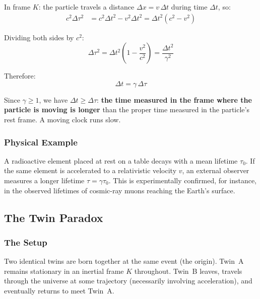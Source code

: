 In frame $K$: the particle travels a distance $\Delta x = v\,\Delta t$ during time $\Delta t$, so:
\begin{align}
    c^2 \Delta\tau^2 &= c^2 \Delta t^2 - v^2 \Delta t^2 = \Delta t^2 \left(c^2 - v^2\right)
    \label{eq:lec05:time-dilation-derivation}
\end{align}

Dividing both sides by $c^2$:
\begin{equation}\label{eq:lec05:proper-time-relation}
    \Delta\tau^2 = \Delta t^2 \left(1 - \frac{v^2}{c^2}\right) = \frac{\Delta t^2}{\gamma^2}
\end{equation}

Therefore:
\begin{equation}\label{eq:lec05:time-dilation}
    \boxed{\Delta t = \gamma \, \Delta\tau}
\end{equation}

Since $\gamma \geq 1$, we have $\Delta t \geq \Delta\tau$: \textbf{the time measured in the frame where the particle is moving is longer} than the proper time measured in the particle's rest frame. A moving clock runs slow.

\subsubsection*{Physical Example}

A radioactive element placed at rest on a table decays with a mean lifetime $\tau_0$. If the same element is accelerated to a relativistic velocity $v$, an external observer measures a longer lifetime $\tau = \gamma \tau_0$. This is experimentally confirmed, for instance, in the observed lifetimes of cosmic-ray muons reaching the Earth's surface.

\subsection{The Twin Paradox}

\subsubsection*{The Setup}

Two identical twins are born together at the same event (the origin). Twin~A remains stationary in an inertial frame $K$ throughout. Twin~B leaves, travels through the universe at some trajectory (necessarily involving acceleration), and eventually returns to meet Twin~A.

